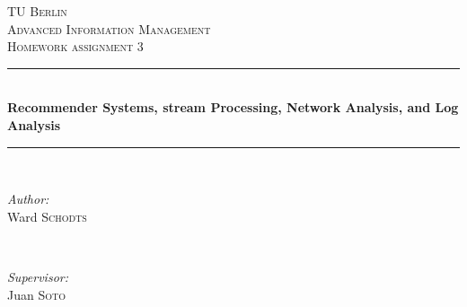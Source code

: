 \documentclass[11pt,a4paper,oneside]{article}
\begin{document}
\begin{titlepage}


\newcommand{\HRule}{\rule{\linewidth}{0.5mm}} %

\center %
 

\textsc{\textsc{\LARGE TU Berlin}}\\[1.5cm] %
\textsc{\Large Advanced Information Management}\\[0.5cm] %
\textsc{\large Homework assignment 3}\\[0.5cm] %


\HRule \\[0.4cm]
{ \huge \bfseries Recommender Systems, stream Processing, Network Analysis, and Log Analysis}\\[0.4cm] %
\HRule \\[1.5cm]
 

\begin{minipage}{0.4\textwidth}
\begin{flushleft} \large
\emph{Author:}\\
Ward \textsc{Schodts} %
\end{flushleft}
\end{minipage}
~
\begin{minipage}{0.4\textwidth}
\begin{flushright} \large
\emph{Supervisor:} \\
Juan \textsc{Soto} \\ %

\end{flushright}
\end{minipage}\\[4cm]


\end{titlepage}
\end{document}
